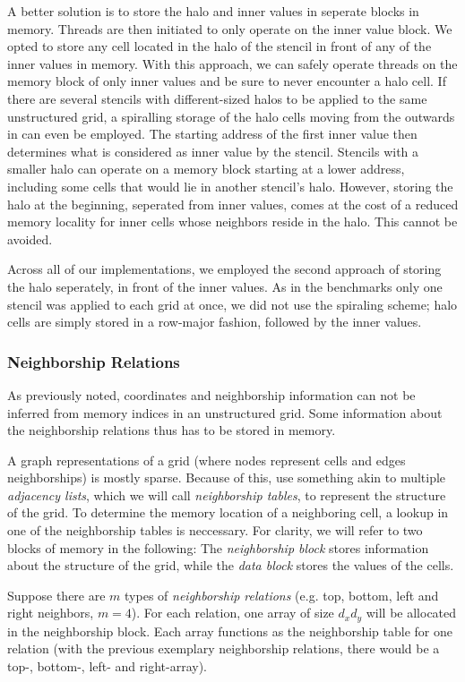 A better solution is to store the halo and inner values in seperate blocks in memory. Threads are then initiated to only operate on the inner value block. We opted to store any cell located in the halo of the stencil in front of any of the inner values in memory. With this approach, we can safely operate threads on the memory block of only inner values and be sure to never encounter a halo cell. If there are several stencils with different-sized halos to be applied to the same unstructured grid, a spiralling storage of the halo cells moving from the outwards in can even be employed. The starting address of the first inner value then determines what is considered as inner value by the stencil. Stencils with a smaller halo can operate on a memory block starting at a lower address, including some cells that would lie in another stencil's halo. However, storing the halo at the beginning, seperated from inner values, comes at the cost of a reduced memory locality for inner cells whose neighbors reside in the halo. This cannot be avoided.

Across all of our implementations, we employed the second approach of storing the halo seperately, in front of the inner values. As in the benchmarks only one stencil was applied to each grid at once, we did not use the spiraling scheme; halo cells are simply stored in a row-major fashion, followed by the inner values.

\subsubsection{Neighborship Relations}

As previously noted, coordinates and neighborship information can not be inferred from memory indices in an unstructured grid. Some information about the neighborship relations thus has to be stored in memory.

A graph representations of a grid (where nodes represent cells and edges neighborships) is mostly sparse. Because of this, use something akin to multiple \emph{adjacency lists}\cite[Chapter 12]{DSA}, which we will call \emph{neighborship tables}, to represent the structure of the grid. To determine the memory location of a neighboring cell, a lookup in one of the neighborship tables is neccessary. For clarity, we will refer to two blocks of memory in the following: The \emph{neighborship block} stores information about the structure of the grid, while the \emph{data block} stores the values of the cells.

Suppose there are $m$ types of \emph{neighborship relations} (e.g. top, bottom, left and right neighbors, $m=4$). For each relation, one array of size $d_xd_y$ will be allocated in the neighborship block. Each array functions as the neighborship table for one relation (with the previous exemplary neighborship relations, there would be a top-, bottom-, left- and right-array).

